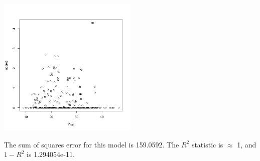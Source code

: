 \documentclass[11pt]{article}
\begin{document}
\begin{enumerate}
\begin{center}
\includegraphics[width=0.5\textwidth]{auto_Yhat_vs_abs_e}
\end{center}

The sum of squares error for this model is 159.0592. The $R^2$ statistic is $\approx$ 1, and 
$1 - R^2$ is 1.294054e-11. 

\end{enumerate}
\pagebreak

\end{document}
